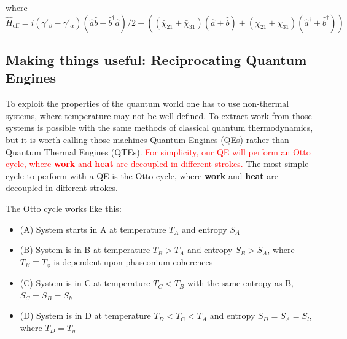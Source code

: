 \documentclass[]{article}
\renewcommand{\a}{\hat{a}}
\newcommand{\ad}{\hat{a}^\dagger}
\renewcommand{\b}{\hat{b}}
\newcommand{\bd}{\hat{b}^\dagger}
\begin{document}
where $\hat{H}_\text{eff}=i(\gamma'_\beta-\gamma'_\alpha)(\a\b-\bd\a)/2+((\bar{\chi}_{21}+\bar{\chi}_{31})(\a+\b)+(\chi_{21}+\chi_{31})(\ad+\bd) )$

\subsection{Making things useful: Reciprocating Quantum Engines}
To exploit the properties of the quantum world one has to use non-thermal systems, where temperature may not be well defined.
To extract work from those systems is possible with the same methods of classical quantum thermodynamics, but it is worth calling those machines Quantum Engines (QEs) rather than Quantum Thermal Engines (QTEs).
\textcolor{red}{For simplicity, our QE will perform an Otto cycle, where \textbf{work} and \textbf{heat} are decoupled in different strokes.}
The most simple cycle to perform with a QE is the Otto cycle, where \textbf{work} and \textbf{heat} are decoupled in different strokes.

The Otto cycle works like this:
\begin{itemize}
    \item (A) System starts in A at temperature $T_A$ and entropy $S_A$
    \item (B) System is in B at temperature $T_B > T_A$ and entropy $S_B > S_A$, where $T_B \equiv T_\phi$ is dependent upon phaseonium coherences
    \item (C) System is in C at temperature $T_C < T_B$ with the same entropy as B, $S_C = S_B = S_h$
    \item (D) System is in D at temperature $T_D < T_C < T_A$ and entropy $S_D = S_A = S_l$, where $T_D = T_\eta$
\end{itemize} 
\end{document}
